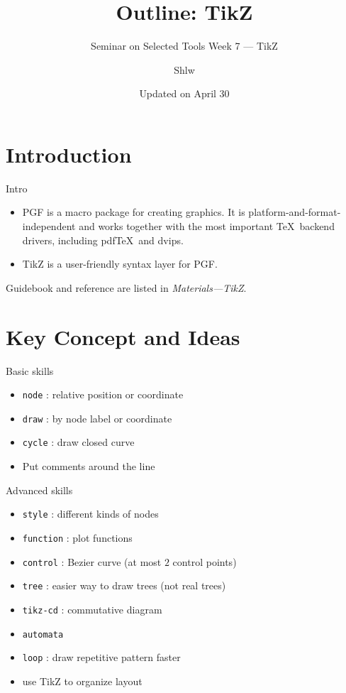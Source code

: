 \documentclass[english, nochinese]{../TeXTemplate/pkuslide}
\title{Outline: TikZ}
\subtitle{Seminar on Selected Tools Week 7 --- TikZ}
\author{Shlw}
\date{Updated on April 30}
\begin{document}
\begin{frame}
\titlepage
\end{frame}

\begin{frame}
\tableofcontents[subsectionstyle=show]
\end{frame}

\section{Introduction}

\begin{frame}
\sectionpage
\end{frame}

\begin{frame}{Intro}
\begin{itemize}
\item PGF is a macro package for creating graphics.
    It is platform-and-format-independent and
    works together with the most important \TeX\ backend drivers,
    including pdf\TeX\ and dvips.
\item TikZ is a user-friendly syntax layer for PGF.
\end{itemize}
Guidebook and reference are listed in \textit{Materials---TikZ}.
\end{frame}

\section{Key Concept and Ideas}

\begin{frame}
\sectionpage
\end{frame}

\begin{frame}[fragile]{Basic skills}
\begin{itemize}
\item \verb"node" : relative position or coordinate
\item \verb"draw" : by node label or coordinate
\item \verb"cycle" : draw closed curve
\item Put comments around the line
\end{itemize}
\end{frame}

\begin{frame}[fragile]{Advanced skills}
\begin{itemize}
\item \verb"style" : different kinds of nodes
\item \verb"function" : plot functions
\item \verb"control" : Bezier curve (at most $2$ control points)
\item \verb"tree" : easier way to draw trees (not real trees)
\item \verb"tikz-cd" : commutative diagram
\item \verb"automata"
\item \verb"loop" : draw repetitive pattern faster
\item use TikZ to organize layout
\end{itemize}
\end{frame}
\end{document}
